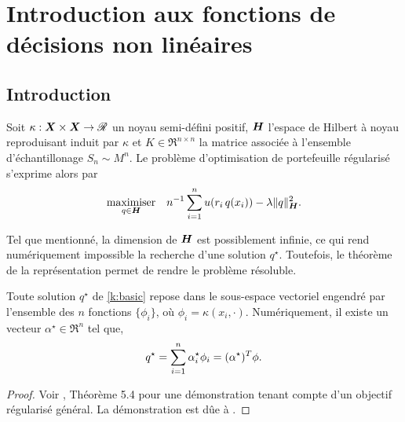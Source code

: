 \section{Introduction aux fonctions de décisions non linéaires}

\subsection{Introduction}

Soit $\kappa: \bm{X} \times \bm{X} \to \mathscr{R}$ un noyau semi-défini positif, $\bm H$ l'espace de Hilbert à noyau
reproduisant induit par $\kappa$ et $K \in \Re^{n \times n}$ la matrice associée à l'ensemble
d'échantillonage $S_n \sim M^n$. Le problème d'optimisation de portefeuille régularisé
s'exprime alors par
\begin{equation}
  \label{k:basic}
  \maximizeEquation[q \in \H]{n^{-1}\sumi u(r_i\,q(x_i)) - \lambda\|q\|^2_{\H}.}
\end{equation}

Tel que mentionné, la dimension de $\bm H$ est possiblement infinie, ce qui rend
numériquement impossible la recherche d'une solution $q^\star$. Toutefois, le théorème de la
représentation permet de rendre le problème résoluble. 

\begin{thm*}
  Toute solution $q^\star$ de \eqref{k:basic} repose dans le sous-espace vectoriel engendré
  par l'ensemble des $n$ fonctions $\{\phi_i\}$, où $\phi_i = \kappa(x_i,\cdot)$. Numériquement, il
  existe un vecteur $\alpha^\star \in \Re^n$ tel que,
  \begin{equation}
    q^\star = \sum_{i=1}^n \alpha^\star_i \phi_i = (\alpha^\star)^T\phi.
  \end{equation}
\end{thm*}
\begin{proof}
  Voir \cite{mohri2012foundations}, Théorème 5.4 pour une démonstration tenant compte d'un
  objectif régularisé général. La démonstration est dûe à \cite{kimeldorf1971some}.
\end{proof}

